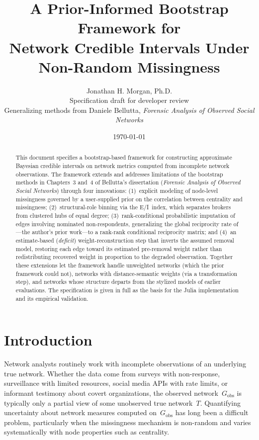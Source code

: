 \documentclass[11pt]{article}
\title{A Prior-Informed Bootstrap Framework for\\Network Credible Intervals Under Non-Random Missingness}
\author{Jonathan H. Morgan, Ph.D.\\
\small Specification draft for developer review\\
\small Generalizing methods from Daniele Bellutta, \emph{Forensic Analysis of Observed Social Networks}}
\date{\today}
\newcommand{\Gobs}{G_{\text{obs}}}
\begin{document}
\maketitle

\begin{abstract}
This document specifies a bootstrap-based framework for constructing approximate Bayesian credible intervals on network metrics computed from incomplete network observations. The framework extends and addresses limitations of the bootstrap methods in Chapters~3 and~4 of Bellutta's dissertation (\emph{Forensic Analysis of Observed Social Networks}) through four innovations: (1)~explicit modeling of node-level missingness governed by a user-supplied prior on the correlation between centrality and missingness; (2)~structural-role binning via the E/I~index, which separates brokers from clustered hubs of equal degree; (3)~rank-conditional probabilistic imputation of edges involving nominated non-respondents, generalizing the global reciprocity rate of \citet{SmithMorganMoody2022}---the author's prior work---to a rank-rank conditional reciprocity matrix; and (4)~an estimate-based (\emph{deficit}) weight-reconstruction step that inverts the assumed removal model, restoring each edge toward its estimated pre-removal weight rather than redistributing recovered weight in proportion to the degraded observation. Together these extensions let the framework handle unweighted networks (which the prior framework could not), networks with distance-semantic weights (via a transformation step), and networks whose structure departs from the stylized models of earlier evaluations. The specification is given in full as the basis for the Julia implementation and its empirical validation.
\end{abstract}

\section{Introduction}

Network analysts routinely work with incomplete observations of an underlying true network. Whether the data come from surveys with non-response, surveillance with limited resources, social media APIs with rate limits, or informant testimony about covert organizations, the observed network~$\Gobs$ is typically only a partial view of some unobserved true network~$T$. Quantifying uncertainty about network measures computed on~$\Gobs$ has long been a difficult problem, particularly when the missingness mechanism is non-random and varies systematically with node properties such as centrality.
\end{document}

